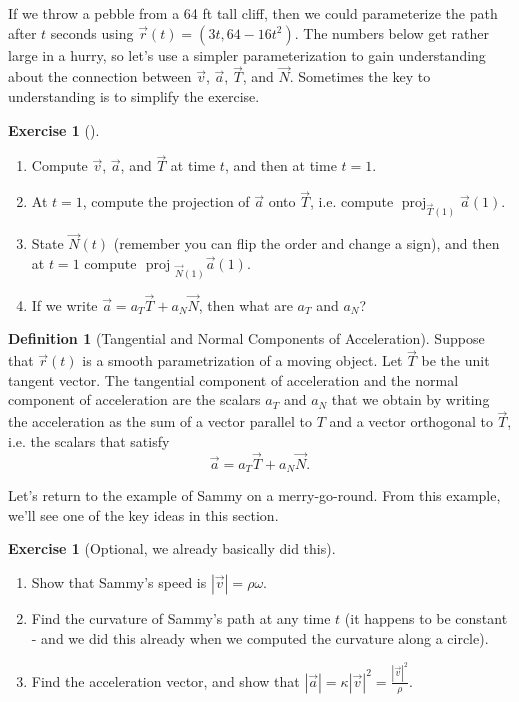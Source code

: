 \documentclass[10pt,]{book}
\theoremstyle{plain}
\theoremstyle{definition}
\newtheorem{definition}[theorem]{Definition}
\theoremstyle{definition}
\theoremstyle{definition}
\theoremstyle{definition}
\newtheorem{exploration}[project]{Exercise}
\theoremstyle{definition}
\numberwithin{equation}{section}
\newcommand{\ds}{\displaystyle}
\DeclareMathOperator{\proj}{proj}
\begin{document}
If we throw a pebble from a 64 ft tall cliff, then we could parameterize the path after \(t\) seconds using \(\vec r(t) = (3t,64-16t^2)\). The numbers below get rather large in a hurry, so let's use a simpler parameterization to gain understanding about the connection between \(\vec v\), \(\vec a\), \(\vec T\), and \(\vec N\). Sometimes the key to understanding is to simplify the exercise.%
\begin{exploration}[]\label{exploration-180}
\leavevmode%
\begin{enumerate}[font=\bfseries,label=(\alph*),ref=\alph*]
\item\label{task-446} Compute \(\vec v\), \(\vec a\), and \(\vec T\) at time \(t\), and then at time \(t=1\).%
\item\label{task-447} At \(t=1\), compute the projection of \(\vec a\) onto \(\vec T\), i.e. compute \(\proj_{\vec T(1)}\vec a(1)\).%
\item\label{task-448} State \(\vec N(t)\) (remember you can flip the order and change a sign), and then at \(t=1\) compute \(\text{ proj } _{\vec N(1)}\vec a(1)\).%
\item\label{task-449} If we write \(\vec a = a_T\vec T +a_N\vec N\), then what are \(a_T\) and \(a_N\)?%
\end{enumerate}
\end{exploration}
\begin{definition}[{Tangential and Normal Components of Acceleration}]\label{definition-30}
Suppose that \(\vec r(t)\) is a smooth parametrization of a moving object. Let \(\vec T\) be the unit tangent vector. The tangential component of acceleration and the normal component of acceleration are the scalars \(a_T\) and \(a_N\) that we obtain by writing the acceleration as the sum of a vector parallel to \(T\) and a vector orthogonal to \(\vec T\), i.e. the scalars that satisfy%
\begin{equation*}
\vec a = a_T\vec T+a_N\vec N.
\end{equation*}
%
\end{definition}
Let's return to the example of Sammy on a merry-go-round. From this example, we'll see one of the key ideas in this section.%
\begin{exploration}[Optional, we already basically did this]\label{exploration-181}
\leavevmode%
\begin{enumerate}[font=\bfseries,label=(\alph*),ref=\alph*]
\item\label{task-450} Show that Sammy's speed is \(|\vec v|=\rho \omega\).%
\item\label{task-451} Find the curvature of Sammy's path at any time \(t\) (it happens to be constant - and we did this already when we computed the curvature along a circle).%
\item\label{task-452} Find the acceleration vector, and show that \(\ds |\vec a| = \kappa |\vec v|^2 = \frac{|\vec v|^2}{\rho}\).%
\end{enumerate}
\end{exploration}
\end{document}

